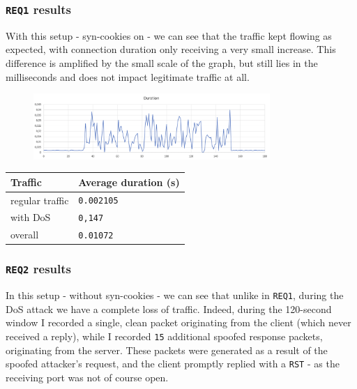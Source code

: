 \documentclass[a4paper,11pt,hidelinks]{article}
\begin{document}
\subsubsection{\texttt{REQ1} results}

With this setup - syn-cookies on - we can see that the traffic kept flowing as expected, with connection duration only receiving a very small increase. This difference is amplified by the small scale of the graph, but still lies in the milliseconds and does not impact legitimate traffic at all.

\begin{figure}[h!]
  \centering
  \includegraphics[width=0.8\textwidth]{../drawable/req1.png}
\end{figure}

\begin{table}[h!]
  \centering
  \begin{tabular}{|l|l|}
    \hline
    Traffic         & Average duration (s)    \\ \hline
    regular traffic & \verb=0.002105= \\ \hline
    with DoS        & \verb=0,147= \\ \hline
    overall         & \verb=0.01072= \\ \hline
  \end{tabular}
\end{table}

\subsubsection{\texttt{REQ2} results}

In this setup - without syn-cookies - we can see that unlike in \verb=REQ1=, during the DoS attack we have a complete loss of traffic. Indeed, during the 120-second window I recorded a single, clean packet originating from the client (which never received a reply), while I recorded \verb=15= additional spoofed response packets, originating from the server. These packets were generated as a result of the spoofed attacker's request, and the client promptly replied with a \verb=RST= - as the receiving port was not of course open.
\end{document}

